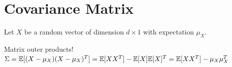 \section{Covariance Matrix}
Let $X$  be a random vector of dimension $d \times 1$ with expectation $\mu _{X}$. 

Matrix outer products!\\ 

$\Sigma =\mathbb E[(X- \mu _{X})(X- \mu _{X})^ T] = \\
\mathbb {E}[XX^ T] - \mathbb {E}[X]\mathbb {E}[X]^ T
\\= \mathbb {E}[XX^ T] - \mu _{X}\mu _{X}^ T$